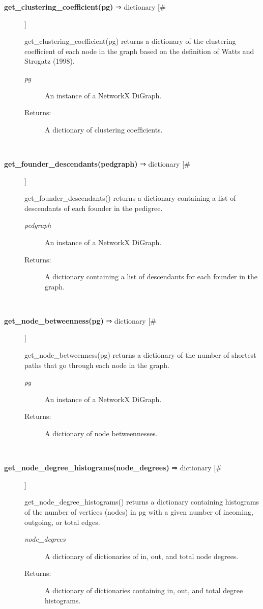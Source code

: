\documentclass{article}
\begin{document}
\begin{description}
\item[\textbf{get\_clustering\_coefficient(pg)} ⇒ dictionary [\#]
]
\par get\_clustering\_coefficient(pg) returns a dictionary of the clustering
coefficient of each node in the graph based on the definition of Watts
and Strogatz (1998).
\begin{description}
\item[\textit{pg}
]
An instance of a NetworkX DiGraph.
\item[Returns:
]
A dictionary of clustering coefficients.
\end{description}\\

\item[\textbf{get\_founder\_descendants(pedgraph)} ⇒ dictionary [\#]
]
\par get\_founder\_descendants() returns a dictionary containing a list of descendants of
each founder in the pedigree.
\begin{description}
\item[\textit{pedgraph}
]
An instance of a NetworkX DiGraph.
\item[Returns:
]
A dictionary containing a list of descendants for each founder in the graph.
\end{description}\\

\item[\textbf{get\_node\_betweenness(pg)} ⇒ dictionary [\#]
]
\par get\_node\_betweenness(pg) returns a dictionary of the
number of shortest paths that go through each node in
the graph.
\begin{description}
\item[\textit{pg}
]
An instance of a NetworkX DiGraph.
\item[Returns:
]
A dictionary of node betweennesses.
\end{description}\\

\item[\textbf{get\_node\_degree\_histograms(node\_degrees)} ⇒ dictionary [\#]
]
\par get\_node\_degree\_histograms() returns a dictionary containing histograms of
the number of vertices (nodes) in pg with a given number of incoming,
outgoing, or total edges.
\begin{description}
\item[\textit{node\_degrees}
]
A dictionary of dictionaries of in, out, and total node degrees.
\item[Returns:
]
A dictionary of dictionaries containing in, out, and total degree histograms.
\end{description}\\


\end{description}
\end{document}
